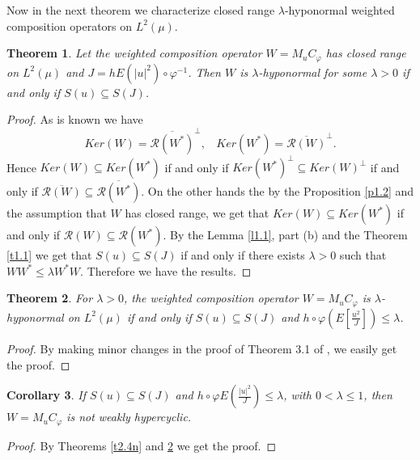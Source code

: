 \documentclass{amsart}
\newtheorem{thm}{Theorem}[section]
\newtheorem{cor}[thm]{Corollary}
\theoremstyle{definition}\newtheorem{defn}[thm]{Definition}
\theoremstyle{remark}
\numberwithin{equation}{section}
\begin{document}
Now in the next theorem we characterize closed range $\lambda$-hyponormal weighted composition operators on $L^2(\mu)$.
\begin{thm}\label{t3.4}
Let the weighted composition operator $W=M_uC_{\varphi}$ has closed range on $L^2(\mu)$ and $J=hE(|u|^2)\circ\varphi^{-1}$. Then $W$ is $\lambda$-hyponormal for some $\lambda>0$ if and only if $S(u)\subseteq S(J)$.
\end{thm}
\begin{proof} As is known we have 
$$Ker(W)=\overline{\mathcal{R}(W^*)}^{\perp}, \ \ \ \ Ker(W^*)=\overline{\mathcal{R}(W)}^{\perp}.$$
Hence $Ker(W)\subseteq Ker(W^*)$ if and only if $Ker(W^*)^{\perp}\subseteq Ker(W)^{\perp}$ if and only if $\overline{\mathcal{R}(W)}\subseteq \overline{\mathcal{R}(W^*)}$. On the other hands the by the Proposition \ref{p1.2} and the assumption that $W$ has closed range, we get that $Ker(W)\subseteq Ker(W^*)$ if and only if $\mathcal{R}(W) \subseteq \mathcal{R}(W^*)$. By the Lemma \ref{l1.1}, part (b) and the Theorem \ref{t1.1} we get that $S(u)\subseteq S(J)$ if and only if there exists $\lambda>0$ such that $WW^*\leq \lambda W^*W$. Therefore we have the results.

\end{proof}

\begin{thm}\label{t3.5} For $\lambda>0$, the weighted composition operator $W=M_uC_{\varphi}$ is $\lambda$-hyponormal on $L^2(\mu)$ if and only if $S(u)\subseteq S(J)$ and $h\circ\varphi\left(E\left[\frac{u^2}{J}\right]\right)\leq \lambda$.
\end{thm}
\begin{proof}
By making minor changes in the proof of Theorem 3.1 of \cite{lam}, we easily get the proof.
\end{proof}
\begin{cor}\label{cor3.6}
If $S(u)\subseteq S(J)$ and $h\circ \varphi E(\frac{|u|^2}{J})\leq \lambda$, with $0<\lambda\leq 1$, then $W=M_uC_{\varphi}$ is not weakly hypercyclic.
\end{cor}
\begin{proof}
By Theorems \ref{t2.4n} and \ref{t3.5} we get the proof.
\end{proof}
\end{document}
